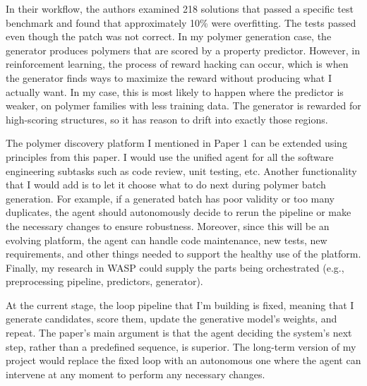 \documentclass[11pt,a4paper]{article}
\begin{document}
In their workflow, the authors examined 218 solutions that passed a specific test benchmark and found that approximately 10\% were overfitting. The tests passed even though the patch was not correct. In my polymer generation case, the generator produces polymers that are scored by a property predictor. However, in reinforcement learning, the process of reward hacking can occur, which is when the generator finds ways to maximize the reward without producing what I actually want. In my case, this is most likely to happen where the predictor is weaker, on polymer families with less training data. The generator is rewarded for high-scoring structures, so it has reason to drift into exactly those regions.


The polymer discovery platform I mentioned in Paper 1 can be extended using principles from this paper. I would use the unified agent for all the software engineering subtasks such as code review, unit testing, etc. Another functionality that I would add is to let it choose what to do next during polymer batch generation. For example, if a generated batch has poor validity or too many duplicates, the agent should autonomously decide to rerun the pipeline or make the necessary changes to ensure robustness. Moreover, since this will be an evolving platform, the agent can handle code maintenance, new tests, new requirements, and other things needed to support the healthy use of the platform. Finally, my research in WASP could supply the parts being orchestrated (e.g., preprocessing pipeline, predictors, generator).


At the current stage, the loop pipeline that I'm building is fixed, meaning that I generate candidates, score them, update the generative model's weights, and repeat. The paper's main argument is that the agent deciding the system's next step, rather than a predefined sequence, is superior. The long-term version of my project would replace the fixed loop with an autonomous one where the agent can intervene at any moment to perform any necessary changes. 
\end{document}
